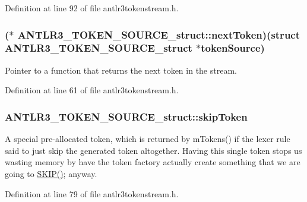 Definition at line 92 of file antlr3tokenstream.\-h.

\hypertarget{struct_a_n_t_l_r3___t_o_k_e_n___s_o_u_r_c_e__struct_ac1e745731ff025ccd806f6becfb4c4ea}{
\subsubsection[{next\-Token}]{($\ast$ A\-N\-T\-L\-R3\-\_\-\-T\-O\-K\-E\-N\-\_\-\-S\-O\-U\-R\-C\-E\-\_\-struct\-::next\-Token)(struct {\bf A\-N\-T\-L\-R3\-\_\-\-T\-O\-K\-E\-N\-\_\-\-S\-O\-U\-R\-C\-E\-\_\-struct} $\ast$token\-Source)}}\label{struct_a_n_t_l_r3___t_o_k_e_n___s_o_u_r_c_e__struct_ac1e745731ff025ccd806f6becfb4c4ea}
Pointer to a function that returns the next token in the stream. 

Definition at line 61 of file antlr3tokenstream.\-h.

\hypertarget{struct_a_n_t_l_r3___t_o_k_e_n___s_o_u_r_c_e__struct_a417f3d7f340e55046200a8dc20bdf5bd}{
\subsubsection[{skip\-Token}]{ A\-N\-T\-L\-R3\-\_\-\-T\-O\-K\-E\-N\-\_\-\-S\-O\-U\-R\-C\-E\-\_\-struct\-::skip\-Token}}\label{struct_a_n_t_l_r3___t_o_k_e_n___s_o_u_r_c_e__struct_a417f3d7f340e55046200a8dc20bdf5bd}
A special pre-\/allocated token, which is returned by m\-Tokens() if the lexer rule said to just skip the generated token altogether. Having this single token stops us wasting memory by have the token factory actually create something that we are going to \hyperlink{cif_lexer_8cpp_a76d5244b498df3281b386d116caf0c11}{S\-K\-I\-P()}; anyway. 

Definition at line 79 of file antlr3tokenstream.\-h.

